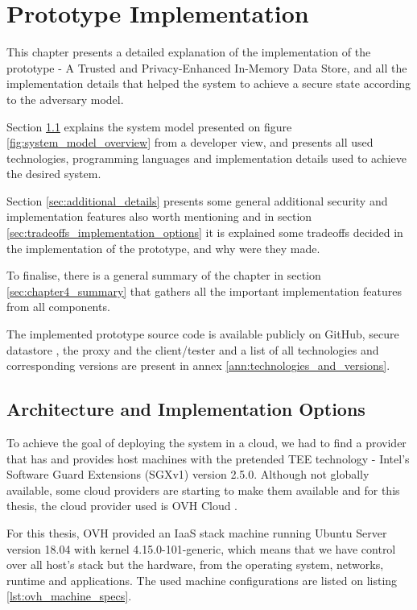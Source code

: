 
\chapter{Prototype Implementation}
\label{cha:elaboration_plan}

This chapter presents a detailed explanation of the implementation of the prototype - A Trusted and Privacy-Enhanced In-Memory Data Store, and all the implementation details that helped the system to achieve a secure state according to the adversary model.

Section \ref{sec:architecture_implementation_options} explains the system model presented on figure \ref{fig:system_model_overview} from a developer view, and presents all used technologies, programming languages and implementation details used to achieve the desired system.

Section \ref{sec:additional_details} presents some general additional security and implementation features also worth mentioning and in section \ref{sec:tradeoffs_implementation_options} it is explained some tradeoffs decided in the implementation of the prototype, and why were they made. 

To finalise, there is a general summary of the chapter in section \ref{sec:chapter4_summary} that gathers all the important implementation features from all components.

The implemented prototype source code is available publicly on GitHub, secure datastore \cite{thesis-repository:container}, the proxy \cite{thesis-repository:proxy} and the client/tester \cite{thesis-repository:client} and a list of all technologies and corresponding versions are present in annex \ref{ann:technologies_and_versions}.

\section{Architecture and Implementation Options}
\label{sec:architecture_implementation_options}

To achieve the goal of deploying the system in a cloud, we had to find a provider that has and provides host machines with the pretended \gls{TEE} technology - Intel's Software Guard Extensions (\gls{SGX}v1) version 2.5.0. Although not globally available, some cloud providers are starting to make them available and for this thesis, the cloud provider used is OVH Cloud \cite{ovhcloud:1}. 

For this thesis, OVH provided an IaaS stack machine running Ubuntu Server version 18.04 with kernel 4.15.0-101-generic, which means that we have control over all host's stack but the hardware, from the operating system, networks, runtime and applications. The used machine configurations are listed on listing \ref{lst:ovh_machine_specs}.

